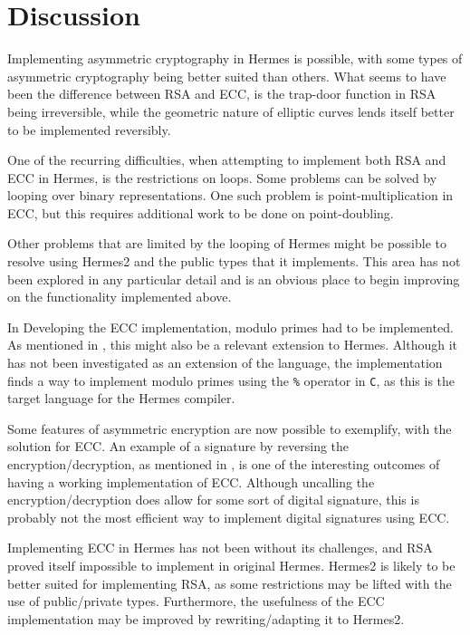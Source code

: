 

\chapter{Discussion}
Implementing asymmetric cryptography in Hermes is possible, with some types of asymmetric cryptography being better suited than others. What seems to have been the difference between RSA and ECC, is the trap-door function in RSA being irreversible, while the geometric nature of elliptic curves lends itself better to be implemented reversibly.

One of the recurring difficulties, when attempting to implement both RSA and ECC in Hermes, is the restrictions on loops. Some problems can be solved by looping over binary representations. One such problem is point-multiplication in ECC, but this requires additional work to be done on point-doubling.

Other problems that are limited by the looping of Hermes might be possible to resolve using Hermes2 and the public types that it implements. This area has not been explored in any particular detail and is an obvious place to begin improving on the functionality implemented above.

In Developing the ECC implementation, modulo primes had to be implemented. As mentioned in \cite{PSI19}, this might also be a relevant extension to Hermes. Although it has not been investigated as an extension of the language, the implementation finds a way to implement modulo primes using the \texttt{\%} operator in \texttt{C}, as this is the target language for the Hermes compiler. 

Some features of asymmetric encryption are now possible to exemplify, with the solution for ECC. An example of a signature by reversing the encryption/decryption, as mentioned in \cite{EaRC}, is one of the interesting outcomes of having a working implementation of ECC. Although uncalling the encryption/decryption does allow for some sort of digital signature, this is probably not the most efficient way to implement digital signatures using ECC.

Implementing ECC in Hermes has not been without its challenges, and RSA proved itself impossible to implement in original Hermes. Hermes2 is likely to be better suited for implementing RSA, as some restrictions may be lifted with the use of public/private types. Furthermore, the usefulness of the ECC implementation may be improved by rewriting/adapting it to Hermes2.

